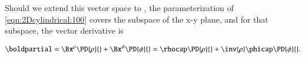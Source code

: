 Should we extend this vector space to , the parameterization of \cref{eqn:2Dcylindrical:100} covers the subspace of the x-y plane, and for that subspace, the vector derivative is

\begin{dmath}\label{eqn:2Dcylindrical:601}
\boldpartial
=
\Bx^\rho \PD{\rho}{}
+ \Bx^\phi \PD{\phi}{}
=
\rhocap \PD{\rho}{}
+\inv{\rho} \phicap \PD{\phi}{}.
\end{dmath}

